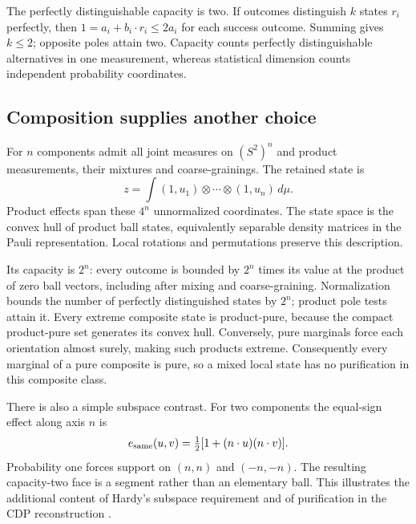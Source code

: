 \documentclass[11pt,a4paper]{article}
\begin{document}
The perfectly distinguishable capacity is two. If outcomes distinguish $k$
states $r_i$ perfectly, then $1=a_i+b_i\cdot r_i\le2a_i$ for each success
outcome. Summing gives $k\le2$; opposite poles attain two. Capacity counts
perfectly distinguishable alternatives in one measurement, whereas statistical
dimension counts independent probability coordinates.

\subsection{Composition supplies another choice}
For $n$ components admit all joint measures on $(S^2)^n$ and product
measurements, their mixtures and coarse-grainings. The retained state is
\begin{equation}
 z=\int (1,u_1)\otimes\cdots\otimes(1,u_n)\,d\mu.
\end{equation}
Product effects span these $4^n$ unnormalized coordinates. The state space is
the convex hull of product ball states, equivalently separable density
matrices in the Pauli representation. Local rotations and permutations
preserve this description.

Its capacity is $2^n$: every outcome is bounded by $2^n$ times its value at
the product of zero ball vectors, including after mixing and coarse-graining.
Normalization bounds the number of perfectly distinguished states by $2^n$;
product pole tests attain it. Every extreme composite state is product-pure,
because the compact product-pure set generates its convex hull. Conversely,
pure marginals force each orientation almost surely, making such products
extreme. Consequently every marginal of a pure composite is pure, so a mixed
local state has no purification in this composite class.

There is also a simple subspace contrast. For two components the equal-sign
effect along axis $n$ is
\begin{equation}
 e_{\rm same}(u,v)=\tfrac12[1+(n\cdot u)(n\cdot v)].
\end{equation}
Probability one forces support on $(n,n)$ and $(-n,-n)$. The resulting
capacity-two face is a segment rather than an elementary ball. This illustrates
the additional content of Hardy's subspace requirement \cite{hardy} and of
purification in the CDP reconstruction \cite{cdp}.
\end{document}
